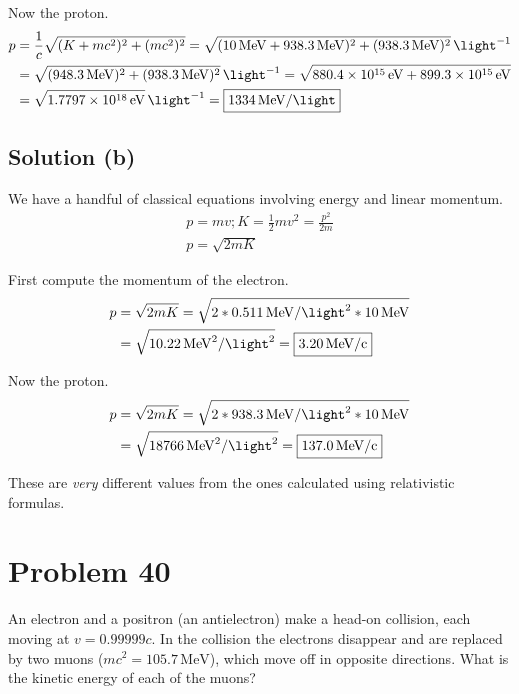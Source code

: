 \documentclass[12pt]{article}
\newcommand{\E}[1]{\times 10^{#1}}
\begin{document}
        Now the proton.
        \footnotesize
        \begin{align}
            p   &=  \frac{1}{c} \sqrt{(K + mc^2)^2 + (mc^2)^2}
                =   \sqrt{(10\,\unit{\mega\eV} + 938.3\,\unit{\mega\eV})^2 + (938.3\,\unit{\mega\eV})^2}\,\unit{\light^{-1}}\\
                &=  \sqrt{(948.3\,\unit{\mega\eV})^2 + (938.3\,\unit{\mega\eV})^2}\,\unit{\light^{-1}}
                =   \sqrt{880.4\E{15}\,\unit{\eV} + 899.3\E{15}\,\unit{\eV}}\\
                &=   \sqrt{1.7797\E{18}\,\unit{\eV}}\,\unit{\light^{-1}}
                =  \boxed{1334\,\unit{\mega\eV/\light}}
        \end{align}
        \normalsize

    \subsection{Solution (b)}
        We have a handful of classical equations involving energy and linear momentum.
        \begin{gather}
            p = mv;
            K = \frac{1}{2}mv^2 = \frac{p^2}{2m}\\
            p = \sqrt{2mK}
        \end{gather}

        First compute the momentum of the electron.
        \begin{align}
            p   &=  \sqrt{2mK}
                =   \sqrt{2 * 0.511\,\unit{\mega\eV/\light^2} * 10\,\unit{\mega\eV}}\\
                &=  \sqrt{10.22\,\unit{\mega\eV^2/\light^2}}
                =   \boxed{3.20\,\unit{\mega\eV/c}}
        \end{align}

        Now the proton.
        \begin{align}
            p   &=  \sqrt{2mK}
                =   \sqrt{2 * 938.3\,\unit{\mega\eV/\light^2} * 10\,\unit{\mega\eV}}\\
                &=  \sqrt{18766\,\unit{\mega\eV^2/\light^2}}
                =   \boxed{137.0\,\unit{\mega\eV/c}}
        \end{align}
        
        These are \textit{very} different values from the ones calculated using relativistic formulas.
    \pagebreak

\section{Problem 40} %
    An electron and a positron (an antielectron) make a head-on collision, each moving at $v = 0.99999c$. 
    In the collision the electrons disappear and are replaced by two muons ($mc^2 = 105.7\,\unit{\mega\eV}$), which move off in opposite directions. 
    What is the kinetic energy of each of the muons?
\end{document}
